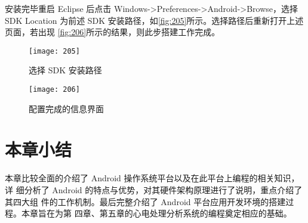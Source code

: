 安装完毕重启 Eclipse 后点击 Windows->Preferences->Android->Browse，选择 SDK
Location 为前述 SDK 安装路径，如\autoref{fig:205}所示。选择路径后重新打开上述页面，若出现
\autoref{fig:206}所示的结果，则此步搭建工作完成。

\begin{figure}[htbp]
    \centering
    \texttt{[image: 205]}
    \caption{\label{fig:205}选择 SDK 安装路径}
\end{figure}

\begin{figure}[htbp]
    \centering
    \texttt{[image: 206]}
    \caption{\label{fig:206}配置完成的信息界面}
\end{figure}

\section{本章小结}
本章比较全面的介绍了 Android 操作系统平台以及在此平台上编程的相关知识，详
细分析了 Android 的特点与优势，对其硬件架构原理进行了说明，重点介绍了其四大组
件的工作机制。最后完整介绍了 Android 平台应用开发环境的搭建过程。本章旨在为第
四章、第五章的心电处理分析系统的编程奠定相应的基础。